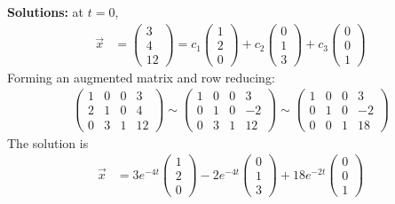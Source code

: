 \begin{parts}
\ifnum {} {\color{DarkBlue} 
\textbf{Solutions:} at $t=0$, 
    \begin{align}
        \vec x &= 
        \begin{pmatrix} 3\\4\\12 \end{pmatrix} = 
        c_1  \begin{pmatrix} 1\\2\\0  \end{pmatrix} + 
        c_2  \begin{pmatrix} 0\\1\\3  \end{pmatrix} + 
        c_3  \begin{pmatrix} 0\\0\\1 \end{pmatrix}
    \end{align}
    Forming an augmented matrix and row reducing: 
    \begin{align}
        \begin{pmatrix} 1&0&0&3 \\ 2&1&0 & 4 \\ 0&3&1&12 \end{pmatrix} 
        \sim \begin{pmatrix} 1&0&0&3 \\ 0&1&0 & -2 \\ 0&3&1&12 \end{pmatrix} 
        \sim \begin{pmatrix} 1&0&0&3 \\ 0&1&0 & -2 \\ 0& 0 &1&18 \end{pmatrix} 
    \end{align}
    The solution is
    \begin{align}
        \vec x &= 
        3 e^{-4t} \begin{pmatrix} 1\\2\\0  \end{pmatrix} 
        -2 e^{-4t} \begin{pmatrix} 0\\1\\3  \end{pmatrix} 
        +18 e^{-2t} \begin{pmatrix} 0\\0\\1 \end{pmatrix}
    \end{align}    
} 
\else 
\fi    
\end{parts}
\fi


